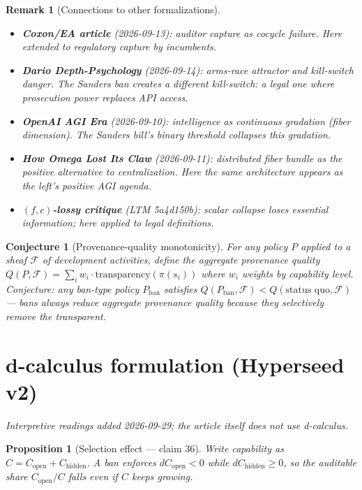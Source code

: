 \documentclass[11pt,a4paper]{article}
\newtheorem{proposition}[definition]{Proposition}
\newtheorem{conjecture}[definition]{Conjecture}
\newtheorem{remark}[definition]{Remark}
\begin{document}
\begin{remark}[Connections to other formalizations]
\begin{itemize}
\item \textbf{Coxon/EA article} (2026-09-13): auditor capture as cocycle
  failure. Here extended to regulatory capture by incumbents.
\item \textbf{Dario Depth-Psychology} (2026-09-14): arms-race attractor
  and kill-switch danger. The Sanders ban creates a different kill-switch:
  a legal one where prosecution power replaces API access.
\item \textbf{OpenAI AGI Era} (2026-09-10): intelligence as continuous
  gradation (fiber dimension). The Sanders bill's binary threshold
  collapses this gradation.
\item \textbf{How Omega Lost Its Claw} (2026-09-11): distributed fiber
  bundle as the positive alternative to centralization. Here the same
  architecture appears as the left's positive AGI agenda.
\item \textbf{$(f,c)$-lossy critique} (LTM 5a4d150b): scalar collapse
  loses essential information; here applied to legal definitions.
\end{itemize}
\end{remark}

\begin{conjecture}[Provenance-quality monotonicity]
For any policy $P$ applied to a sheaf $\mathcal{F}$ of development
activities, define the \emph{aggregate provenance quality}
$Q(P, \mathcal{F}) = \sum_i w_i \cdot \text{transparency}(\pi(s_i))$
where $w_i$ weights by capability level. Conjecture: any ban-type
policy $P_{\text{ban}}$ satisfies
$Q(P_{\text{ban}}, \mathcal{F}) < Q(\text{status quo}, \mathcal{F})$
--- bans always reduce aggregate provenance quality because they
selectively remove the transparent.
\end{conjecture}


\section{d-calculus formulation (Hyperseed v2)}
\emph{Interpretive readings added 2026-09-29; the article itself does not use d-calculus.}

\begin{proposition}[Selection effect --- claim 36]
Write capability as $C=C_{\mathrm{open}}+C_{\mathrm{hidden}}$. A ban enforces
$dC_{\mathrm{open}}<0$ while $dC_{\mathrm{hidden}}\ge 0$, so the auditable share
$C_{\mathrm{open}}/C$ falls even if $C$ keeps growing.
\end{proposition}
\end{document}
